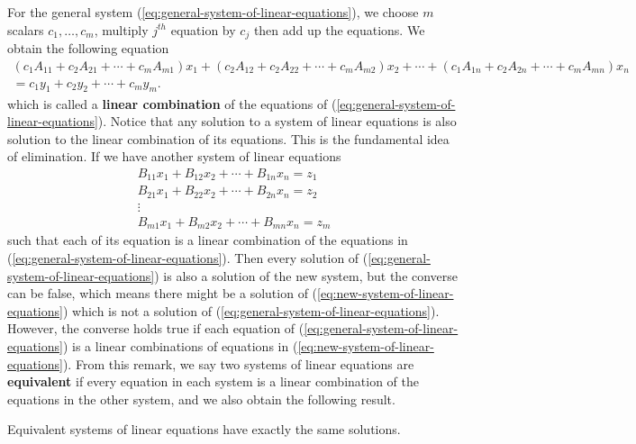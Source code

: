 For the general system (\ref{eq:general-system-of-linear-equations}), we choose $m$ scalars $c_{1}, \ldots, c_{m}$, multiply $j^{th}$ equation by $c_{j}$ then add up the equations. We obtain the following equation
\begin{multline*}
    (c_{1}A_{11} + c_{2}A_{21} + \cdots + c_{m}A_{m1})x_{1} + (c_{2}A_{12} + c_{2}A_{22} + \cdots + c_{m}A_{m2})x_{2} + \cdots + (c_{1}A_{1n} + c_{2}A_{2n} + \cdots + c_{m}A_{mn})x_{n} \\
    = c_{1}y_{1} + c_{2}y_{2} + \cdots + c_{m}y_{m}.
\end{multline*}
which is called a \textbf{linear combination} of the equations of (\ref{eq:general-system-of-linear-equations}). Notice that any solution to a system of linear equations is also solution to the linear combination of its equations. This is the fundamental idea of elimination. If we have another system of linear equations
\begin{equation}
    \begin{split}
        B_{11}x_{1} + B_{12}x_{2} + \cdots + B_{1n}x_{n} = z_{1}  \\
        B_{21}x_{1} + B_{22}x_{2} + \cdots + B_{2n}x_{n} = z_{2}  \\
        \vdots \\
        B_{m1}x_{1} + B_{m2}x_{2} + \cdots + B_{mn}x_{n} = z_{m}
    \end{split}\label{eq:new-system-of-linear-equations}
\end{equation}
such that each of its equation is a linear combination of the equations in (\ref{eq:general-system-of-linear-equations}). Then every solution of (\ref{eq:general-system-of-linear-equations}) is also a solution of the new system, but the converse can be false, which means there might be a solution of (\ref{eq:new-system-of-linear-equations}) which is not a solution of (\ref{eq:general-system-of-linear-equations}). However, the converse holds true if each equation of (\ref{eq:general-system-of-linear-equations}) is a linear combinations of equations in (\ref{eq:new-system-of-linear-equations}). From this remark, we say two systems of linear equations are \textbf{equivalent} if every equation in each system is a linear combination of the equations in the other system, and we also obtain the following result.

\begin{theorem}
    Equivalent systems of linear equations have exactly the same solutions.
\end{theorem}

